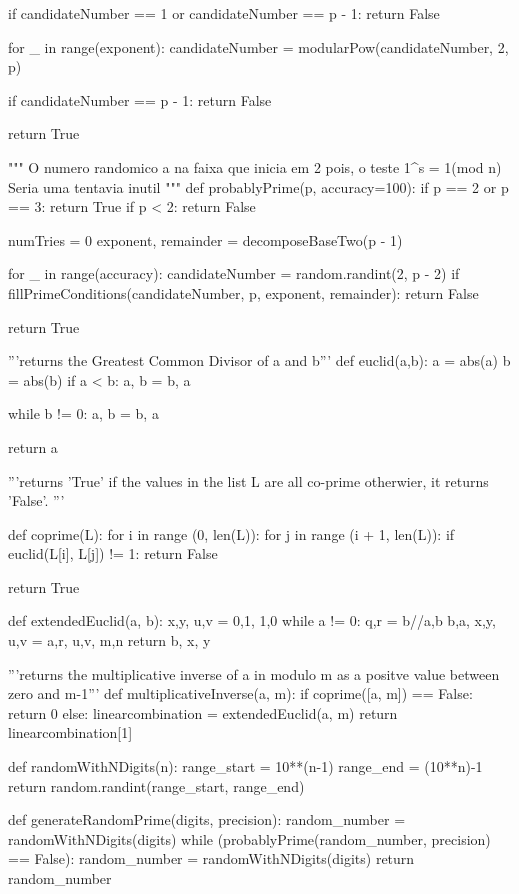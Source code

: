 \documentclass[a4paper,11pt]{article}
\theoremstyle{mytheor}
\begin{document}
   if candidateNumber == 1 or candidateNumber == p - 1:
      return False
 
   for _ in range(exponent):
      candidateNumber = modularPow(candidateNumber, 2, p)
 
      if candidateNumber == p - 1:
         return False
 
   return True
 
"""
  O numero randomico a na faixa que inicia em 2 pois, o teste 1^s = 1(mod n)
  Seria uma tentavia inutil
"""
def probablyPrime(p, accuracy=100):
   if p == 2 or p == 3: return True
   if p < 2: return False
 
   numTries = 0
   exponent, remainder = decomposeBaseTwo(p - 1)
 
   for _ in range(accuracy):
      candidateNumber = random.randint(2, p - 2)
      if fillPrimeConditions(candidateNumber, p, exponent, remainder):
         return False
 
   return True


'''returns the Greatest Common Divisor of a and b'''
def euclid(a,b):
    a = abs(a)
    b = abs(b)
    if a < b:
        a, b = b, a

    while b != 0:
        a, b = b, a %

    return a

'''returns 'True' if the values in the list L are all co-prime
   otherwier, it returns 'False'. '''

def coprime(L):
    for i in range (0, len(L)):
        for j in range (i + 1, len(L)):
            if euclid(L[i], L[j]) != 1:
                return False

    return True

def extendedEuclid(a, b):
    x,y, u,v = 0,1, 1,0
    while a != 0:
        q,r = b//a,b%
        b,a, x,y, u,v = a,r, u,v, m,n
    return b, x, y

'''returns the multiplicative inverse of a in modulo m as a positve value between zero and m-1'''
def multiplicativeInverse(a, m):
    if coprime([a, m]) == False:
        return 0
    else:
        linearcombination = extendedEuclid(a, m)
        return linearcombination[1] %

def randomWithNDigits(n):
    range_start = 10**(n-1)
    range_end = (10**n)-1
    return random.randint(range_start, range_end)

def generateRandomPrime(digits, precision):
    random_number = randomWithNDigits(digits)
    while (probablyPrime(random_number, precision) == False):
        random_number = randomWithNDigits(digits)
    return random_number
\end{document}

